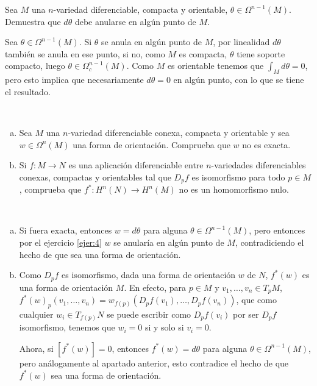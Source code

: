 \documentclass[twoside]{article}
\begin{document}
\begin{ejercicio}{4}
Sea $M$ una $n$-variedad diferenciable, compacta y orientable, $\theta\in \Omega^{n-1}(M)$. Demuestra que $d\theta$ debe anularse en algún punto de $M$.
\end{ejercicio}
\begin{solucion}
Sea $\theta\in\Omega^{n-1}(M)$. Si $\theta$ se anula en algún punto de $M$, por linealidad $d\theta$ también se anula en ese punto, si no, como $M$ es compacta, $\theta$ tiene soporte compacto, luego $\theta\in\Omega_c^{n-1}(M)$. Como $M$ es orientable tenemos que $\int_M d\theta=0$, pero esto implica que necesariamente $d\theta=0$ en algún punto, con lo que se tiene el resultado.
\end{solucion}

\newpage

\begin{ejercicio}{5}\
\begin{enumerate}[a)]
\item Sea $M$ una $n$-variedad diferenciable conexa, compacta y orientable y sea $w\in\Omega^n(M)$ una forma de orientación. Comprueba que $w$ no es exacta.
\item Si $f:M\to N$ es una aplicación diferenciable entre $n$-variedades diferenciables conexas, compactas y orientables tal que $D_pf$ es isomorfismo para todo $p\in M$, comprueba que $f^*:H^n(N)\to H^n(M)$ no es un homomorfismo nulo.
\end{enumerate}

\end{ejercicio}
\begin{solucion}\
\begin{enumerate}[a)]
\item Si fuera exacta, entonces $w=d\theta$ para alguna $\theta\in \Omega^{n-1}(M)$, pero entonces por el ejercicio \ref{ejer:4} $w$ se anularía en algún punto de $M$, contradiciendo el hecho de que sea una forma de orientación.
\item Como $D_pf$ es isomorfismo, dada una forma de orientación $w$ de $N$, $f^*(w)$ es una forma de orientación $M$. En efecto, para $p\in M$ y $v_1,\dots, v_n\in T_pM$, $f^*(w)_p(v_1,\dots, v_n)=w_{f(p)}(D_pf(v_1), \dots, D_pf(v_n))$, que como cualquier $w_i\in T_{f(p)}N$ se puede escribir como $D_pf(v_i)$ por ser $D_pf$ isomorfismo, tenemos que $w_i=0$ si y solo si $v_i=0$.

Ahora, si $[f^*(w)]=0$, entonces $f^*(w)=d\theta$ para alguna $\theta\in \Omega^{n-1}(M)$, pero análogamente al apartado anterior, esto contradice el hecho de que $f^*(w)$ sea una forma de orientación.
\end{enumerate}
\end{solucion}
\end{document}
